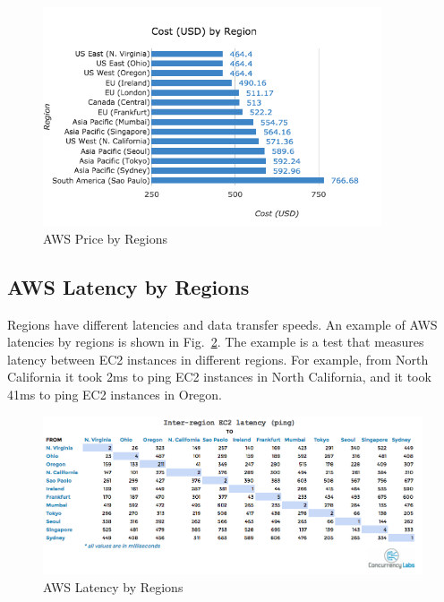 \begin{figure}[H]
  \centering
  \includegraphics[width = 10cm]{./Figure-files/overview/aws-price-chart.png}
  \caption{AWS Price by Regions}
  \label{fig_aws_price_by_regions}
\end{figure}


\subsection{AWS Latency by Regions}
Regions have different latencies and data transfer speeds. 
An example of AWS latencies by regions is shown in Fig.~\ref{fig_aws_latency_by_regions}.
The example is a test that measures latency between EC2 instances in different regions.
For example, from North California it took 2ms to ping EC2 instances in North California,
and it took 41ms to ping EC2 instances in Oregon.

\begin{figure}[H]
  \centering
  \includegraphics[width = 14cm]{./Figure-files/overview/ec2-ping-table.png}
  \caption{AWS Latency by Regions}
  \label{fig_aws_latency_by_regions}
\end{figure}




